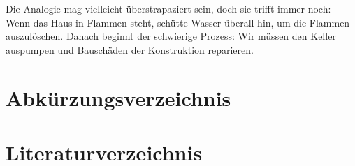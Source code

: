 \documentclass[
        onecolumn,
        a4paper,
        abstracton,
        parskip=half
        ,final
        ]{scrartcl}
\begin{document}
Die Analogie mag vielleicht {\"u}berstrapaziert sein, doch sie trifft immer noch: Wenn das Haus in Flammen steht, sch{\"u}tte Wasser {\"u}berall hin, um die Flammen auszul{\"o}schen. Danach beginnt der schwierige Prozess: Wir m{\"u}ssen den Keller auspumpen und Bausch{\"a}den der Konstruktion reparieren.

\clearpage

\section{Abk{\"u}rzungsverzeichnis}
  \label{sec5:Abkuerzungsverzeichnis}

\begin{acronym}[ESZB]


\end{acronym}

\vspace{10pt}
  \newpage
    \singlespacing



\section{Literaturverzeichnis}
  \label{sec6:Literaturverzeichnis}
  \newpage





\end{document}
